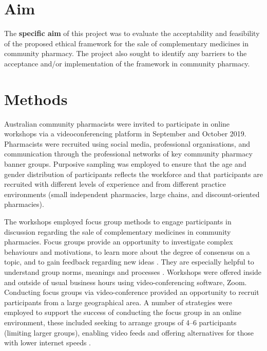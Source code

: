 \documentclass[12pt,]{article}
\begin{document}
\section{Aim}\label{aim}

The \textbf{specific aim} of this project was to evaluate the
acceptability and feasibility of the proposed ethical framework for the
sale of complementary medicines in community pharmacy. The project also
sought to identify any barriers to the acceptance and/or implementation
of the framework in community pharmacy.

\section{Methods}\label{methods}

Australian community pharmacists were invited to participate in online
workshops via a videoconferencing platform in September and October
2019. Pharmacists were recruited using social media, professional
organisations, and communication through the professional networks of
key community pharmacy banner groups. Purposive sampling was employed to
ensure that the age and gender distribution of participants reflects the
workforce and that participants are recruited with different levels of
experience and from different practice environments (small independent
pharmacies, large chains, and discount-oriented pharmacies).

The workshops employed focus group methods to engage participants in
discussion regarding the sale of complementary medicines in community
pharmacies. Focus groups provide an opportunity to investigate complex
behaviours and motivations, to learn more about the degree of consensus
on a topic, and to gain feedback regarding new ideas
\autocites{Basch1987}{Knodel1993}. They are especially helpful to
understand group norms, meanings and processes \autocite{BarbourFG2011}.
Workshops were offered inside and outside of usual business hours using
video-conferencing software, Zoom. Conducting focus groups via
video-conference provided an opportunity to recruit participants from a
large geographical area. A number of strategies were employed to support
the success of conducting the focus group in an online environment,
these included seeking to arrange groups of 4--6 participants (limiting
larger groups), enabling video feeds and offering alternatives for those
with lower internet speeds \autocite{Gaiser2017}.
\end{document}
